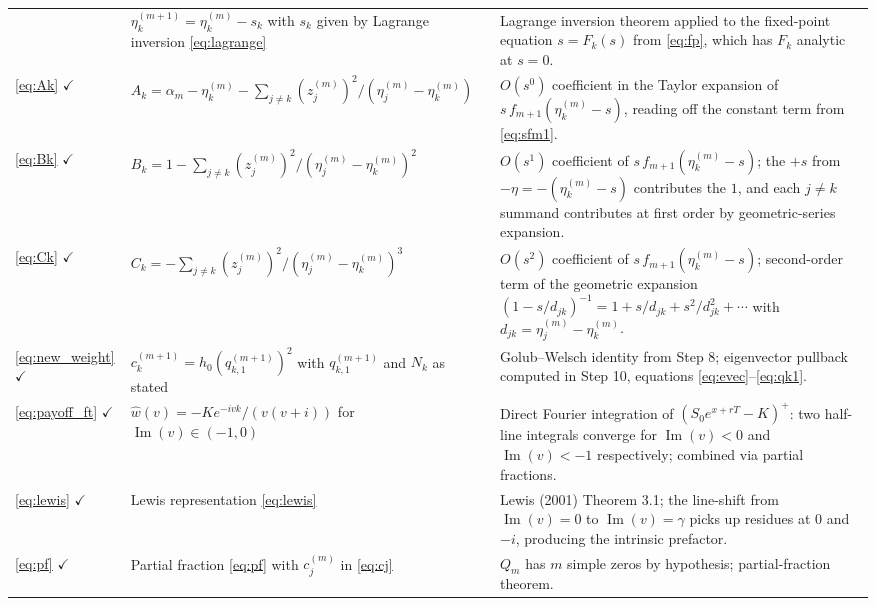\documentclass{article}
\begin{document}
\begin{longtable}{@{}p{}p{}p{}@{}}
  & $\eta_k^{(m+1)} = \eta_k^{(m)} - s_k$ with $s_k$ given by
    Lagrange inversion \eqref{eq:lagrange}
  & Lagrange inversion theorem applied to the fixed-point equation
    $s = F_k(s)$ from \eqref{eq:fp}, which has $F_k$ analytic at
    $s=0$. \\
\addlinespace
%
\eqref{eq:Ak} $\checkmark$
  & $A_k = \alpha_m - \eta_k^{(m)} - \sum_{j\ne k}
    (z_j^{(m)})^2/(\eta_j^{(m)}-\eta_k^{(m)})$
  & $O(s^0)$ coefficient in the Taylor expansion of
    $s\,f_{m+1}(\eta_k^{(m)}-s)$, reading off the constant term
    from \eqref{eq:sfm1}. \\
\addlinespace
%
\eqref{eq:Bk} $\checkmark$
  & $B_k = 1 - \sum_{j\ne k}
    (z_j^{(m)})^2/(\eta_j^{(m)}-\eta_k^{(m)})^2$
  & $O(s^1)$ coefficient of $s\,f_{m+1}(\eta_k^{(m)}-s)$;
    the $+s$ from $-\eta = -(\eta_k^{(m)}-s)$ contributes the $1$,
    and each $j\ne k$ summand contributes at first order by
    geometric-series expansion. \\
\addlinespace
%
\eqref{eq:Ck} $\checkmark$
  & $C_k = -\sum_{j\ne k}(z_j^{(m)})^2/(\eta_j^{(m)}-\eta_k^{(m)})^3$
  & $O(s^2)$ coefficient of $s\,f_{m+1}(\eta_k^{(m)}-s)$;
    second-order term of the geometric expansion
    $(1 - s/d_{jk})^{-1} = 1 + s/d_{jk} + s^2/d_{jk}^2 + \cdots$
    with $d_{jk}=\eta_j^{(m)}-\eta_k^{(m)}$. \\
\addlinespace
%
\eqref{eq:new_weight} $\checkmark$
  & $c_k^{(m+1)} = h_0(q_{k,1}^{(m+1)})^2$ with $q_{k,1}^{(m+1)}$
    and $N_k$ as stated
  & Golub--Welsch identity from Step 8; eigenvector pullback
    computed in Step 10, equations
    \eqref{eq:evec}--\eqref{eq:qk1}. \\
\addlinespace
%
\eqref{eq:payoff_ft} $\checkmark$
  & $\widehat{w}(v) = -Ke^{-ivk}/(v(v+i))$ for
    $\operatorname{Im}(v)\in(-1,0)$
  & Direct Fourier integration of $(S_0e^{x+rT}-K)^+$: two
    half-line integrals converge for $\operatorname{Im}(v)<0$ and
    $\operatorname{Im}(v)<-1$ respectively; combined via partial
    fractions. \\
\addlinespace
%
\eqref{eq:lewis} $\checkmark$
  & Lewis representation \eqref{eq:lewis}
  & Lewis (2001) Theorem 3.1; the line-shift from
    $\operatorname{Im}(v)=0$ to $\operatorname{Im}(v)=\gamma$ picks
    up residues at $0$ and $-i$, producing the intrinsic
    prefactor. \\
\addlinespace
%
\eqref{eq:pf} $\checkmark$
  & Partial fraction \eqref{eq:pf} with $c_j^{(m)}$ in
    \eqref{eq:cj}
  & $Q_m$ has $m$ simple zeros by hypothesis; partial-fraction
    theorem. \\

\end{longtable}
\end{document}
